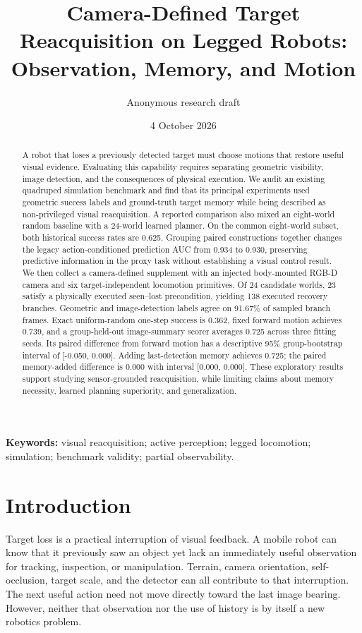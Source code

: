 \documentclass[10pt,twocolumn,a4paper]{article}
\title{Camera-Defined Target Reacquisition on Legged Robots:\\Observation, Memory, and Motion}
\author{Anonymous research draft}
\date{4 October 2026}
\begin{document}
\maketitle
\begin{abstract}
A robot that loses a previously detected target must choose motions that restore useful visual evidence. Evaluating this capability requires separating geometric visibility, image detection, and the consequences of physical execution. We audit an existing quadruped simulation benchmark and find that its principal experiments used geometric success labels and ground-truth target memory while being described as non-privileged visual reacquisition. A reported comparison also mixed an eight-world random baseline with a 24-world learned planner. On the common eight-world subset, both historical success rates are 0.625. Grouping paired constructions together changes the legacy action-conditioned prediction AUC from 0.934 to 0.930, preserving predictive information in the proxy task without establishing a visual control result. We then collect a camera-defined supplement with an injected body-mounted RGB-D camera and six target-independent locomotion primitives. Of 24 candidate worlds, 23 satisfy a physically executed seen--lost precondition, yielding 138 executed recovery branches. Geometric and image-detection labels agree on 91.67\% of sampled branch frames. Exact uniform-random one-step success is 0.362, fixed forward motion achieves 0.739, and a group-held-out image-summary scorer averages 0.725 across three fitting seeds. Its paired difference from forward motion has a descriptive 95\% group-bootstrap interval of [-0.050, 0.000]. Adding last-detection memory achieves 0.725; the paired memory-added difference is 0.000 with interval [0.000, 0.000]. These exploratory results support studying sensor-grounded reacquisition, while limiting claims about memory necessity, learned planning superiority, and generalization.
\end{abstract}
\noindent\textbf{Keywords:} visual reacquisition; active perception; legged locomotion; simulation; benchmark validity; partial observability.

\section{Introduction}
Target loss is a practical interruption of visual feedback. A mobile robot can know that it previously saw an object yet lack an immediately useful observation for tracking, inspection, or manipulation. Terrain, camera orientation, self-occlusion, target scale, and the detector can all contribute to that interruption. The next useful action need not move directly toward the last image bearing. However, neither that observation nor the use of history is by itself a new robotics problem.
\end{document}
